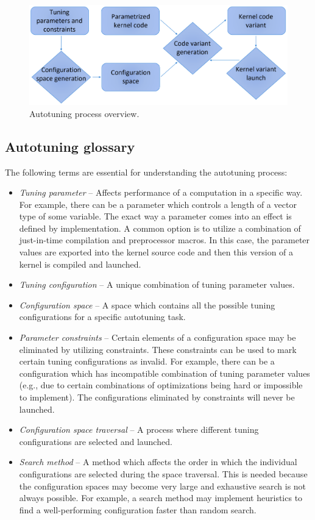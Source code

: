 \documentclass[
  digital,     %
  oneside,     %
  nosansbold,  %
  nocolorbold, %
  lof,         %
  lot,         %
  nocover
]{fithesis4}
\begin{document}
\begin{figure}
	\begin{center}
	\includegraphics[width=125mm]{Figures/AutotuningSchema.png}
	\end{center}
	\caption{Autotuning process overview.}
	\label{autotuning-schema}
\end{figure}

\subsection{Autotuning glossary}
The following terms are essential for understanding the autotuning process:
\begin{itemize}
	\item \textit{Tuning parameter} -- Affects performance of a computation in a specific way. For example, there can be a parameter which controls a length of a vector type of some variable. The exact way a parameter comes into an effect is defined by implementation. A common option is to utilize a combination of just-in-time compilation and preprocessor macros. In this case, the parameter values are exported into the kernel source code and then this version of a kernel is compiled  and launched.
	\item \textit{Tuning configuration} -- A unique combination of tuning parameter values.
	\item \textit{Configuration space} -- A space which contains all the possible tuning configurations for a specific autotuning task.
	\item \textit{Parameter constraints} -- Certain elements of a configuration space may be eliminated by utilizing constraints. These constraints can be used to mark certain tuning configurations as invalid. For example, there can be a configuration which has incompatible combination of tuning parameter values (e.g., due to certain combinations of optimizations being hard or impossible to implement). The configurations eliminated by constraints will never be launched.
	\item \textit{Configuration space traversal} -- A process where different tuning configurations are selected and launched.
	\item \textit{Search method} -- A method which affects the order in which the individual configurations are selected during the space traversal. This is needed because the configuration spaces may become very large and exhaustive search is not always possible. For example, a search method may implement heuristics to find a well-performing configuration faster than random search.
\end{itemize}
\end{document}
